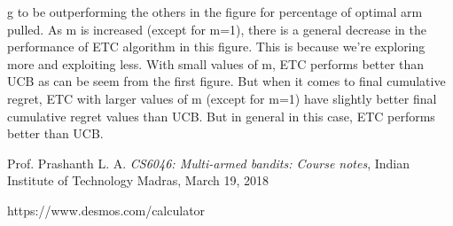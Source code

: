 \documentclass[12pt]{report}
\begin{document}
			g to be outperforming the others in the figure for percentage of optimal arm pulled. As m is increased (except for m=1), there is a general decrease in the performance of ETC algorithm in this figure. This is because we're exploring more and exploiting less. With small values of m, ETC performs better than UCB as can be seem from the first figure. But when it comes to final cumulative regret, ETC with larger values of m (except for m=1) have slightly better final cumulative regret values than UCB. But in general in this case, ETC performs better than UCB.
			
\begin{thebibliography}{9}
Prof. Prashanth L. A. \textit{CS6046: Multi-armed bandits: Course notes}, 
Indian Institute of Technology Madras, March 19, 2018

https://www.desmos.com/calculator
\end{thebibliography}
\end{document}
